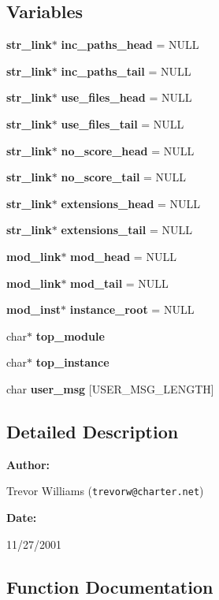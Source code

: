 \subsection*{Variables}
\begin{CompactItemize}
\item 
{\bf str\_\-link}$\ast$ {\bf inc\_\-paths\_\-head} = NULL
\item 
{\bf str\_\-link}$\ast$ {\bf inc\_\-paths\_\-tail} = NULL
\item 
{\bf str\_\-link}$\ast$ {\bf use\_\-files\_\-head} = NULL
\item 
{\bf str\_\-link}$\ast$ {\bf use\_\-files\_\-tail} = NULL
\item 
{\bf str\_\-link}$\ast$ {\bf no\_\-score\_\-head} = NULL
\item 
{\bf str\_\-link}$\ast$ {\bf no\_\-score\_\-tail} = NULL
\item 
{\bf str\_\-link}$\ast$ {\bf extensions\_\-head} = NULL
\item 
{\bf str\_\-link}$\ast$ {\bf extensions\_\-tail} = NULL
\item 
{\bf mod\_\-link}$\ast$ {\bf mod\_\-head} = NULL
\item 
{\bf mod\_\-link}$\ast$ {\bf mod\_\-tail} = NULL
\item 
{\bf mod\_\-inst}$\ast$ {\bf instance\_\-root} = NULL
\item 
char$\ast$ {\bf top\_\-module}
\item 
char$\ast$ {\bf top\_\-instance}
\item 
char {\bf user\_\-msg} [USER\_\-MSG\_\-LENGTH]
\end{CompactItemize}


\subsection{Detailed Description}


\begin{Desc}
\item[{\bf Author: }]\par
Trevor Williams ({\tt trevorw@charter.net}) \end{Desc}
\begin{Desc}
\item[{\bf Date: }]\par
11/27/2001

\end{Desc}


\subsection{Function Documentation}
